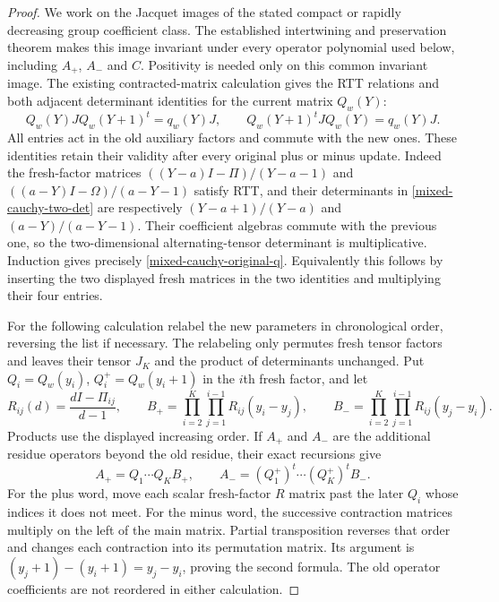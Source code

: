 \begin{proof}
We work on the Jacquet images of the stated compact or rapidly
decreasing group coefficient class.  The established intertwining
and preservation theorem makes this image invariant under every
operator polynomial used below, including $A_+$, $A_-$ and $C$.
Positivity is needed only on this common invariant image.
The existing contracted-matrix calculation gives the RTT relations
and both adjacent determinant identities for the current matrix
$Q_w(Y)$:
\begin{equation}\label{mixed-cauchy-two-det}
 Q_w(Y)JQ_w(Y+1)^t=q_w(Y)J,
 \qquad Q_w(Y+1)^tJQ_w(Y)=q_w(Y)J.
\end{equation}
All entries act in the old auxiliary factors and commute with the
new ones.  These identities retain their validity after every
original plus or minus update.  Indeed the fresh-factor matrices
$((Y-a)I-\Pi)/(Y-a-1)$ and
$((a-Y)I-\Omega)/(a-Y-1)$ satisfy RTT, and their determinants
in \eqref{mixed-cauchy-two-det} are respectively
$(Y-a+1)/(Y-a)$ and $(a-Y)/(a-Y-1)$.
Their coefficient algebras commute with the previous one, so the
two-dimensional alternating-tensor determinant is multiplicative.
Induction gives precisely \eqref{mixed-cauchy-original-q}.
Equivalently this follows by inserting the two displayed fresh
matrices in the two identities and multiplying their four entries.

For the following calculation relabel the new parameters in
chronological order, reversing the list if necessary.  The relabeling
only permutes fresh tensor factors and leaves their tensor $J_K$
and the product of determinants unchanged.  Put $Q_i=Q_w(y_i)$,
$Q_i^+=Q_w(y_i+1)$ in the $i$th fresh factor, and let
\[
 R_{ij}(d)=\frac{dI-\Pi_{ij}}{d-1},\qquad
 B_+=\prod_{i=2}^K\prod_{j=1}^{i-1}R_{ij}(y_i-y_j),\qquad
 B_-=\prod_{i=2}^K\prod_{j=1}^{i-1}R_{ij}(y_j-y_i).
\]
Products use the displayed increasing order.  If $A_+$ and $A_-$
are the additional residue operators beyond the old residue, their
exact recursions give
\begin{equation}\label{mixed-cauchy-fused-factors}
 A_+=Q_1\cdots Q_K B_+,
 \qquad A_-=(Q_1^+)^t\cdots(Q_K^+)^t B_-.
\end{equation}
For the plus word, move each scalar fresh-factor $R$ matrix past
the later $Q_i$ whose indices it does not meet.  For the minus word,
the successive contraction matrices multiply on the left of the
main matrix.  Partial transposition reverses that order and changes
each contraction into its permutation matrix.  Its argument is
$(y_j+1)-(y_i+1)=y_j-y_i$, proving the second formula.  The old
operator coefficients are not reordered in either calculation.


\end{proof}
